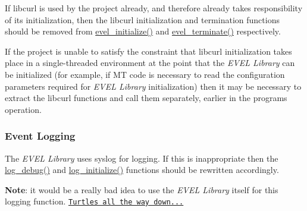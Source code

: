 \begin{DoxyEnumerate}
\item If libcurl is used by the project already, and therefore already takes responsibility of its initialization, then the libcurl initialization and termination functions should be removed from \hyperlink{evel_8c_aff020c5505e724b414ac981e2a23fcd6}{evel\+\_\+initialize()} and \hyperlink{evel_8c_ab3f6225ddb9c5113d74503d4fcd17e5b}{evel\+\_\+terminate()} respectively.
\item If the project is unable to satisfy the constraint that libcurl initialization takes place in a single-\/threaded environment at the point that the {\itshape E\+V\+E\+L Library} can be initialized (for example, if M\+T code is necessary to read the configuration parameters required for {\itshape E\+V\+E\+L Library} initialization) then it may be necessary to extract the libcurl functions and call them separately, earlier in the program\textquotesingle{}s operation.
\end{DoxyEnumerate}

\subsubsection*{Event Logging}

The {\itshape E\+V\+E\+L Library} uses {\ttfamily syslog} for logging. If this is inappropriate then the \hyperlink{evel_8h_ab6073d0ad433cc7e272b66952063a4fb}{log\+\_\+debug()} and \hyperlink{evel_8h_a7e62b4de31e7c058e1534d0ac6040e98}{log\+\_\+initialize()} functions should be rewritten accordingly.

{\bfseries Note}\+: it would be a really bad idea to use the {\itshape E\+V\+E\+L Library} itself for this logging function. \href{https://en.wikipedia.org/wiki/Turtles_all_the_way_down}{\tt Turtles all the way down...} 